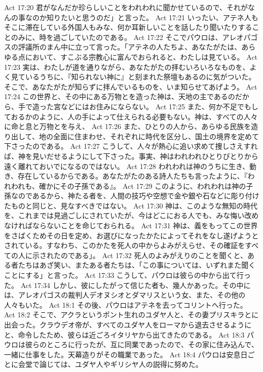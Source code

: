 Act 17:20  君がなんだか珍らしいことをわれわれに聞かせているので、それがなんの事なのか知りたいと思うのだ」と言った。
Act 17:21  いったい、アテネ人もそこに滞在している外国人もみな、何か耳新しいことを話したり聞いたりすることのみに、時を過ごしていたのである。
Act 17:22  そこでパウロは、アレオパゴスの評議所のまん中に立って言った。「アテネの人たちよ、あなたがたは、あらゆる点において、すこぶる宗教心に富んでおられると、わたしは見ている。
Act 17:23  実は、わたしが道を通りながら、あなたがたの拝むいろいろなものを、よく見ているうちに、『知られない神に』と刻まれた祭壇もあるのに気がついた。そこで、あなたがたが知らずに拝んでいるものを、いま知らせてあげよう。
Act 17:24  この世界と、その中にある万物とを造った神は、天地の主であるのだから、手で造った宮などにはお住みにならない。
Act 17:25  また、何か不足でもしておるかのように、人の手によって仕えられる必要もない。神は、すべての人々に命と息と万物とを与え、
Act 17:26  また、ひとりの人から、あらゆる民族を造り出して、地の全面に住まわせ、それぞれに時代を区分し、国土の境界を定めて下さったのである。
Act 17:27  こうして、人々が熱心に追い求めて捜しさえすれば、神を見いだせるようにして下さった。事実、神はわれわれひとりびとりから遠く離れておいでになるのではない。
Act 17:28  われわれは神のうちに生き、動き、存在しているからである。あなたがたのある詩人たちも言ったように、『われわれも、確かにその子孫である』。
Act 17:29  このように、われわれは神の子孫なのであるから、神たる者を、人間の技巧や空想で金や銀や石などに彫り付けたものと同じと、見なすべきではない。
Act 17:30  神は、このような無知の時代を、これまでは見過ごしにされていたが、今はどこにおる人でも、みな悔い改めなければならないことを命じておられる。
Act 17:31  神は、義をもってこの世界をさばくためその日を定め、お選びになったかたによってそれをなし遂げようとされている。すなわち、このかたを死人の中からよみがえらせ、その確証をすべての人に示されたのである」。
Act 17:32  死人のよみがえりのことを聞くと、ある者たちはあざ笑い、またある者たちは、「この事については、いずれまた聞くことにする」と言った。
Act 17:33  こうして、パウロは彼らの中から出て行った。
Act 17:34  しかし、彼にしたがって信じた者も、幾人かあった。その中には、アレオパゴスの裁判人デオヌシオとダマリスという女、また、その他の人々もいた。
Act 18:1  その後、パウロはアテネを去ってコリントへ行った。
Act 18:2  そこで、アクラというポント生れのユダヤ人と、その妻プリスキラとに出会った。クラウデオ帝が、すべてのユダヤ人をローマから退去させるようにと、命令したため、彼らは近ごろイタリヤから出てきたのである。
Act 18:3  パウロは彼らのところに行ったが、互に同業であったので、その家に住み込んで、一緒に仕事をした。天幕造りがその職業であった。
Act 18:4  パウロは安息日ごとに会堂で論じては、ユダヤ人やギリシヤ人の説得に努めた。
